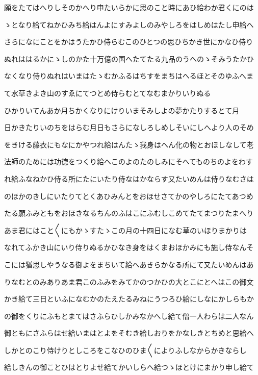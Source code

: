 \documentclass[a4paper,11pt,landscape]{ltjtarticle}
\begin{document}
願をたてはへりしそのかへり申たいらかに思のこと時にあひ給わか君くにのは
\par\medskip
ゝとなり給てねかひみち給はんよにすみよしのみやしろをはしめはたし申給へ
\par\medskip
さらになにことをかはうたかひ侍らむこのひとつの思ひちかき世にかなひ侍り
\par\medskip
ぬれははるかにゝしのかた十万億の国へたてたる九品のうへのゝそみうたかひ
\par\medskip
なくなり侍りぬれはいまはたゝむかふるはちすをまちはへるほとそのゆふへま
\par\medskip
て水草きよき山のすゑにてつとめ侍らむとてなむまかりいりぬる
\par\medskip
ひかりいてんあか月ちかくなりにけりいまそみしよの夢かたりするとて月
\par\medskip
日かきたりいのちをはらむ月日もさらになしろしめしそいにしへより人のそめ
\par\medskip
をきける藤衣にもなにかやつれ給はんたゝ我身はへん化の物とおほしなして老
\par\medskip
法師のためには功徳をつくり給へこのよのたのしみにそへてものちのよをわす
\par\medskip
れ給ふなねかひ侍る所にたにいたり侍なはかならす又たいめんは侍りなむさは
\par\medskip
のほかのきしにいたりてとくあひみんとをおほせさてかのやしろにたてあつめ
\par\medskip
たる願ふみともをおほきなるちんのふはこにふむしこめてたてまつりたまへり
\par\medskip
あま君にはこと〱にもかゝすたゝこの月の十四日になむ草のいほりまかりは
\par\medskip
なれてふかき山にいり侍りぬるかひなき身をはくまおほかみにも施し侍なんそ
\par\medskip
こには猶思しやうなる御よをまちいて給へあきらかなる所にて又たいめんはあ
\par\medskip
りなむとのみありあま君このふみをみてかのつかひの大とこにとへはこの御文
\par\medskip
かき給て三日といふになむかのたえたるみねにうつろひ給にしなにかしらもか
\par\medskip
の御をくりにふもとまてはさふらひしかみなかへし給て僧一人わらは二人なん
\par\medskip
御ともにさふらはせ給いまはとよをそむき給しおりをかなしきとちめと思給へ
\par\medskip
しかとのこり侍けりとしころをこなひのひま〱によりふしなからかきならし
\par\medskip
給しきんの御ことひはとりよせ給てかいしらへ給つゝほとけにまかり申し給て
\end{document}
